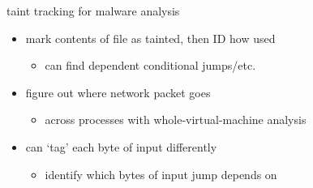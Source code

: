 \begin{frame}{taint tracking for malware analysis}
\begin{itemize}
\item mark contents of file as tainted, then ID how used
    \begin{itemize}
    \item can find dependent conditional jumps/etc.
    \end{itemize}
\item figure out where network packet goes
    \begin{itemize}
    \item across processes with whole-virtual-machine analysis
    \end{itemize}
\vspace{.5cm}
\item can `tag' each byte of input differently
    \begin{itemize}
    \item identify which bytes of input jump depends on
    \end{itemize}
\end{itemize}
\end{frame}
